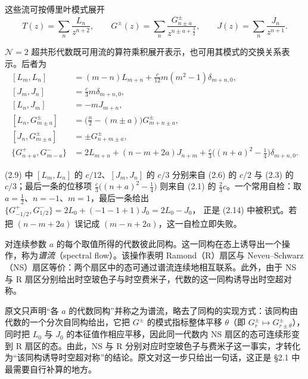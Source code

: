 这些流可按傅里叶模式展开
\begin{equation}\tag{2.8}
T(z)=\sum_{n}\frac{L_{n}}{z^{n+2}},\qquad
G^{\pm}(z)=\sum_{n}\frac{G^{\pm}_{n\pm a}}{z^{n\pm a+\frac{3}{2}}},\qquad
J(z)=\sum_{n}\frac{J_{n}}{z^{n+1}}.
\end{equation}

$\mathcal{N}=2$ 超共形代数既可用流的算符乘积展开表示，也可用其模式的交换关系表示。后者为
\begin{equation}\tag{2.9}
\begin{aligned}
[L_{m},L_{n}]&=(m-n)L_{m+n}+\frac{c}{12}m(m^{2}-1)\delta_{m+n,0},\\
[J_{m},J_{n}]&=\frac{c}{3}m\delta_{m+n,0},\\
[L_{n},J_{m}]&=-mJ_{m+n},\\
[L_{n},G^{\pm}_{m\pm a}]&=\Big(\frac{n}{2}-(m\pm a)\Big)G^{\pm}_{m+n\pm a},\\
[J_{n},G^{\pm}_{m\pm a}]&=\pm G^{\pm}_{n+m\pm a},\\
\{G^{+}_{n+a},G^{-}_{m-a}\}&=2L_{m+n}+(n-m+2a)J_{n+m}+\frac{c}{3}\Big((n+a)^{2}-\frac{1}{4}\Big)\delta_{m+n,0}.
\end{aligned}
\end{equation}

\begin{yizhu}[易错点]
(2.9) 中 $[L_{m},L_{n}]$ 的 $c/12$、$[J_{m},J_{n}]$ 的 $c/3$ 分别来自 (2.6) 的 $c/2$ 与 (2.3) 的 $c/3$；最后一条的位移项 $\frac{c}{3}\big((n+a)^{2}-\frac{1}{4}\big)$ 则来自 (2.1) 的 $\frac{2}{3}c$。一个常用自检：取 $a=\frac{1}{2}$、$n=-1$、$m=1$，最后一条给出
$\{G^{+}_{-1/2},G^{-}_{1/2}\}=2L_{0}+(-1-1+1)J_{0}=2L_{0}-J_{0}$，
正是 (2.14) 中被积式。若把 $(n-m+2a)$ 误记成 $(m-n+2a)$，这一自检立即失败。
\end{yizhu}

对连续参数 $a$ 的每个取值所得的代数彼此同构。这一同构在态上诱导出一个操作，称为\emph{谱流}（spectral flow）。该操作表明 Ramond（R）扇区与 Neveu--Schwarz（NS）扇区等价：两个扇区中的态可通过谱流连续地相互联系。此外，由于 NS 与 R 扇区分别给出时空玻色子与时空费米子，代数的这一同构诱导出时空超对称。

\begin{yizhu}[物理图像]
原文只声明“各 $a$ 的代数同构”并称之为谱流，略去了同构的实现方式：该同构由代数的一个分次自同构给出，它把 $G^{\pm}$ 的模式指标整体平移 $\theta$（即 $G^{\pm}_{r}\mapsto G^{\pm}_{r\pm\theta}$），同时把 $L_{0}$ 与 $J_{0}$ 的本征值作相应平移，因此同一代数内 NS 扇区的态可连续形变到 R 扇区的态。由此，NS 与 R 分别对应时空玻色子与费米子这一事实，才转化为“该同构诱导时空超对称”的结论。原文对这一步只给出一句话，这正是 §2.1 中最需要自行补算的地方。
\end{yizhu}


